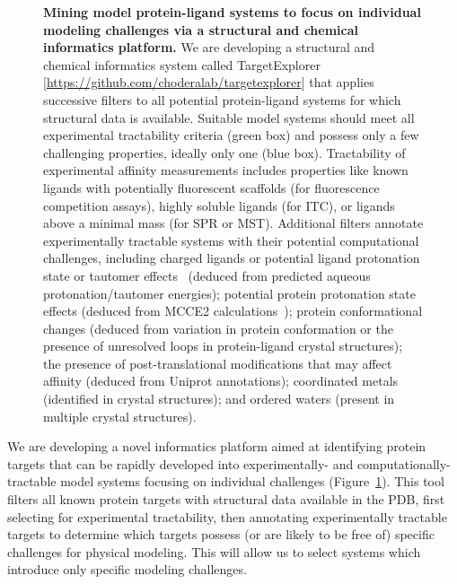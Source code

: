 \documentclass[11pt]{article}
\begin{document}
\begin{figure}
\begin{centering}
\end{centering}
\footnotesize
\caption{\label{figure:mining-for-model-systems}  
\textbf{Mining model protein-ligand systems to focus on individual modeling challenges via a structural and chemical informatics platform.}
We are developing a structural and chemical informatics system called TargetExplorer [\url{https://github.com/choderalab/targetexplorer}] that applies successive filters to all potential protein-ligand systems for which structural data is available. 
Suitable model systems should meet all experimental tractability criteria (green box) and possess only a few challenging properties, ideally only one (blue box).
Tractability of experimental affinity measurements includes properties like known ligands with potentially fluorescent scaffolds (for fluorescence competition assays), highly soluble ligands (for ITC), or ligands above a minimal mass (for SPR or MST).
Additional filters annotate experimentally tractable systems with their potential computational challenges, including charged ligands or potential ligand protonation state or tautomer effects~\cite{Martin:2009:JournalofComputer-AidedMolecularDesign} (deduced from predicted aqueous protonation/tautomer energies); potential protein protonation state effects (deduced from MCCE2 calculations~\cite{Song:2009:JournalofComputationalChemistry}); protein conformational changes (deduced from variation in protein conformation or the presence of unresolved loops in protein-ligand crystal structures); the presence of post-translational modifications that may affect affinity (deduced from Uniprot annotations); coordinated metals (identified in crystal structures); and ordered waters (present in multiple crystal structures).
}
\end{figure}
We are developing a novel informatics platform aimed at identifying protein targets that can be rapidly developed into experimentally- and computationally-tractable model systems focusing on individual challenges (Figure~\ref{figure:mining-for-model-systems}).
This tool filters all known protein targets with structural data available in the PDB, first selecting for experimental tractability, then annotating experimentally tractable targets to determine which targets possess (or are likely to be free of) specific challenges for physical modeling.
This will allow us to select systems which introduce only specific modeling challenges.
\end{document}
